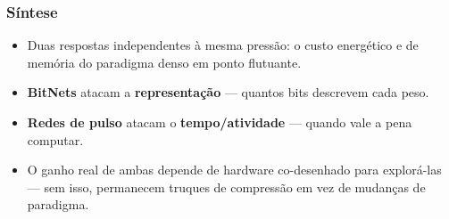 \begin{frame}
	\frametitle{Síntese}
	\begin{itemize}
		\item Duas respostas independentes à mesma pressão: o custo energético e de memória do paradigma denso em ponto flutuante.
		\item \textcolor{bitnetColor}{\textbf{BitNets}} atacam a \textbf{representação} --- quantos bits descrevem cada peso.
		\item \textcolor{snnColor}{\textbf{Redes de pulso}} atacam o \textbf{tempo/atividade} --- quando vale a pena computar.
		\item O ganho real de ambas depende de hardware co-desenhado para explorá-las --- sem isso, permanecem truques de compressão em vez de mudanças de paradigma.
	\end{itemize}
\end{frame}
